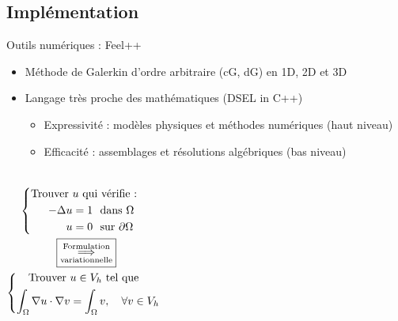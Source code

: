 \normalsize

\subsection{Implémentation}
\begin{frame}{Outils numériques : Feel++ }

  \begin{itemize}
  \item Méthode de Galerkin d'ordre arbitraire (cG, dG) en 1D, 2D et 3D%
  \item Langage très proche des mathématiques (DSEL in C++)
    \begin{itemize}
    \item Expressivité : { \scriptsize modèles physiques et méthodes numériques (\alert{haut niveau})} \\
    \item Efficacité : { \scriptsize assemblages et résolutions algébriques (\alert{bas niveau})}
    \end{itemize}
  \end{itemize}


      \begin{columns}
        \scriptsize
        \vspace*{-0.07\textwidth}

        \begin{eqnarray*}
          \left\{
          \begin{aligned}
            \text{Trouver } &u \text{ qui vérifie :} \quad\quad \\
            -\Delta u &= 1 \ \ \text{dans} \ \Omega \\
            u &= 0 \ \ \text{sur} \ \partial\Omega
          \end{aligned}
          \right. \\
          \fbox{$\underset{\text{variationnelle}}{\overset{\text{Formulation}}{\Longrightarrow}}$} \quad\quad\quad\quad \\
          \left\{
          \begin{aligned}
            \text{Trouver } &u\in V_h \text{ tel que } \\
            \int_\Omega \nabla u \cdot \nabla v &= \int_\Omega v , \quad \forall v \in V_h
          \end{aligned}
          \right.
        \end{eqnarray*}


\end{columns}
\end{frame}
